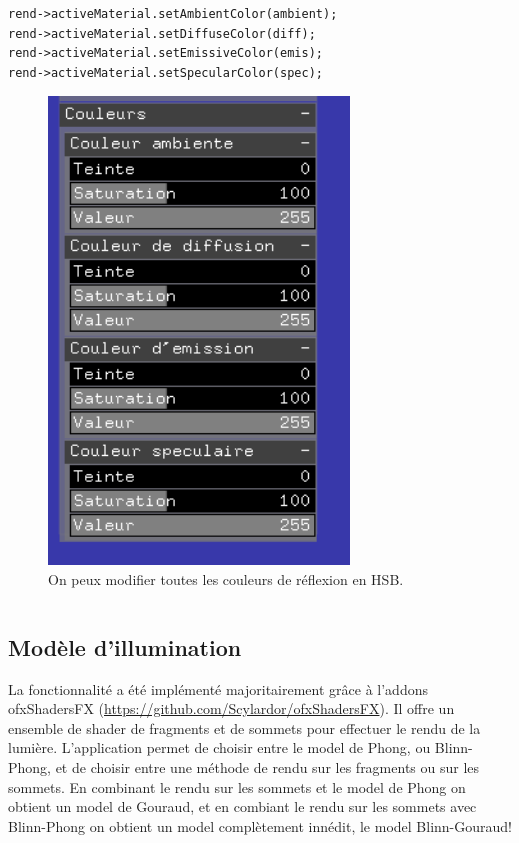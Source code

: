 \begin{lstlisting}
rend->activeMaterial.setAmbientColor(ambient);
rend->activeMaterial.setDiffuseColor(diff);
rend->activeMaterial.setEmissiveColor(emis);
rend->activeMaterial.setSpecularColor(spec);
\end{lstlisting}

\begin{figure}[h]
	\centering
	\includegraphics[width=8cm]{fig/materiaux.png}
	\caption{On peux modifier toutes les couleurs de réflexion en HSB.}
	\label{fig:materiaux}
\end{figure}

\begin{lstlisting}
\end{lstlisting}


\subsection{Modèle d'illumination}
La fonctionnalité a été implémenté majoritairement grâce à l'addons ofxShadersFX (\url{https://github.com/Scylardor/ofxShadersFX}). Il offre un ensemble de shader de fragments et de sommets pour effectuer le rendu de la lumière. L'application permet de choisir entre le model de Phong, ou Blinn-Phong, et de choisir entre une méthode de rendu sur les fragments ou sur les sommets. En combinant le rendu sur les sommets et le model de Phong on obtient un model de Gouraud, et en combiant le rendu sur les sommets avec Blinn-Phong on obtient un model complètement innédit, le model Blinn-Gouraud!

